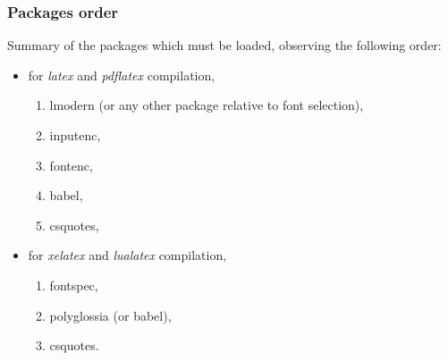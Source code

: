 \documentclass[11pt]{beamer}
\begin{document}
\begin{frame}
	\frametitle{Packages order}
	
	Summary of the packages which must be loaded, observing the following order:
	\begin{itemize}
		\item for \textit{latex} and \textit{pdflatex} compilation,
		\begin{enumerate}
			\item lmodern (or any other package relative to font selection),
			\item inputenc,
			\item fontenc,
			\item babel,
			\item csquotes,
		\end{enumerate}
		\item for \textit{xelatex} and \textit{lualatex} compilation,
		\begin{enumerate}
			\item fontspec,
			\item polyglossia (or babel),
			\item csquotes.
		\end{enumerate}
	\end{itemize}
\end{frame}


  

\end{document}
